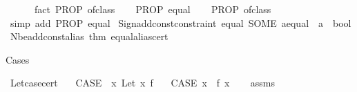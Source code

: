 \begin{isabellebody}
\ \ \ \ \ \ {\isacharparenleft}{\kern0pt}fact\ {\isacartoucheopen}PROP\ {\isacharquery}{\kern0pt}ofclass{\isacartoucheclose}{\isacharparenright}{\kern0pt}\isanewline
{}\isamarkupfalse%
\isanewline
\ \ \isamarkupfalse%
\ {\isachardoublequoteopen}PROP\ {\isacharquery}{\kern0pt}equal{\isachardoublequoteclose}\isanewline
\ \ \isamarkupfalse%
\ {\isachardoublequoteopen}PROP\ {\isacharquery}{\kern0pt}ofclass{\isachardoublequoteclose}\ \isamarkupfalse%
\isanewline
\ \ \isamarkupfalse%
\ {\isacharparenleft}{\kern0pt}simp\ add{\isacharcolon}{\kern0pt}\ {\isacartoucheopen}PROP\ {\isacharquery}{\kern0pt}equal{\isacartoucheclose}{\isacharparenright}{\kern0pt}\isanewline
{}\isamarkupfalse%
%
\endisatagproof
{\isafoldproof}%
%
\isadelimproof
\isanewline
%
\endisadelimproof
%
\isadelimML
\isanewline
%
\endisadelimML
%
\isatagML
{}\isamarkupfalse%
\ {\isacartoucheopen}Sign{\isachardot}{\kern0pt}add{\isacharunderscore}{\kern0pt}const{\isacharunderscore}{\kern0pt}constraint\ {\isacharparenleft}{\kern0pt}\isactrlconstUNDERSCOREname {\isasymopen}equal{\isasymclose}{\isacharcomma}{\kern0pt}\ SOME\ \isactrltyp {\isasymopen}{\isacharprime}{\kern0pt}a{\isacharcolon}{\kern0pt}{\isacharcolon}{\kern0pt}equal\ {\isasymRightarrow}\ {\isacharprime}{\kern0pt}a\ {\isasymRightarrow}\ bool{\isasymclose}{\isacharparenright}{\kern0pt}{\isacartoucheclose}\isanewline
\isanewline
{}\isamarkupfalse%
\ {\isacartoucheopen}Nbe{\isachardot}{\kern0pt}add{\isacharunderscore}{\kern0pt}const{\isacharunderscore}{\kern0pt}alias\ {\isacharat}{\kern0pt}{\isacharbraceleft}{\kern0pt}thm\ equal{\isacharunderscore}{\kern0pt}alias{\isacharunderscore}{\kern0pt}cert{\isacharbraceright}{\kern0pt}{\isacartoucheclose}%
\endisatagML
{\isafoldML}%
%
\isadelimML
%
\endisadelimML
%
\begin{isamarkuptext}%
Cases%
\end{isamarkuptext}\isamarkuptrue%
\isamarkupfalse%
\ Let{\isacharunderscore}{\kern0pt}case{\isacharunderscore}{\kern0pt}cert{\isacharcolon}{\kern0pt}\isanewline
\ \ \ {\isachardoublequoteopen}CASE\ {\isasymequiv}\ {\isacharparenleft}{\kern0pt}{\isasymlambda}x{\isachardot}{\kern0pt}\ Let\ x\ f{\isacharparenright}{\kern0pt}{\isachardoublequoteclose}\isanewline
\ \ \ {\isachardoublequoteopen}CASE\ x\ {\isasymequiv}\ f\ x{\isachardoublequoteclose}\isanewline
%
\isadelimproof
\ \ %
\endisadelimproof
%
\isatagproof
{}\isamarkupfalse%
\ assms\ \isamarkupfalse%

\end{isabellebody}

